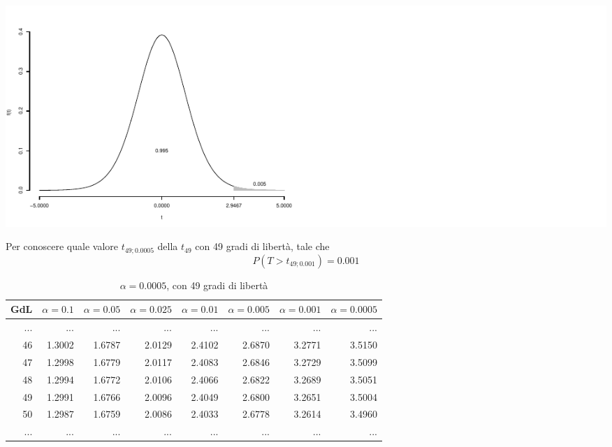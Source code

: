 \documentclass[
  11pt,
]{book}
\theoremstyle{mytheoremstyle}
\theoremstyle{mydefstyle}
\begin{document}
\begin{center}\includegraphics{Appunti_di_Statistica_2025_files/figure-latex/09-Statistiche-Campionarie_2,-1} \end{center}

Per conoscere quale valore \(t_{49;0.0005}\) della \(t_{49}\) con 49 gradi di libertà, tale che
\[P(T>t_{49;0.001})=0.001\]

\begin{table}
\centering
\caption{\label{tab:09-Statistiche-Campionarie-7}$\alpha=0.0005$, con 49 gradi di libertà}
\centering
\fontsize{7}{9}\selectfont
\begin{tabular}[t]{rrrrrr|>{}r|r}
\toprule
GdL & $\alpha=0.1$ & $\alpha=0.05$ & $\alpha=0.025$ & $\alpha=0.01$ & $\alpha=0.005$ & $\alpha=0.001$ & $\alpha=0.0005$\\
\midrule
... & ... & ... & ... & ... & ... & \textcolor[HTML]{AB292E}{...} & \vphantom{1} ...\\
46 & 1.3002 & 1.6787 & 2.0129 & 2.4102 & 2.6870 & \textcolor[HTML]{AB292E}{3.2771} & 3.5150\\
47 & 1.2998 & 1.6779 & 2.0117 & 2.4083 & 2.6846 & \textcolor[HTML]{AB292E}{3.2729} & 3.5099\\
48 & 1.2994 & 1.6772 & 2.0106 & 2.4066 & 2.6822 & \textcolor[HTML]{AB292E}{3.2689} & 3.5051\\
\midrule
\textcolor[HTML]{AB292E}{49} & \textcolor[HTML]{AB292E}{1.2991} & \textcolor[HTML]{AB292E}{1.6766} & \textcolor[HTML]{AB292E}{2.0096} & \textcolor[HTML]{AB292E}{2.4049} & \textcolor[HTML]{AB292E}{2.6800} & \textcolor[HTML]{AB292E}{3.2651} & \textcolor[HTML]{AB292E}{3.5004}\\
\midrule
50 & 1.2987 & 1.6759 & 2.0086 & 2.4033 & 2.6778 & \textcolor[HTML]{AB292E}{3.2614} & 3.4960\\
... & ... & ... & ... & ... & ... & \textcolor[HTML]{AB292E}{...} & ...\\
\bottomrule
\end{tabular}
\end{table}
\end{document}
